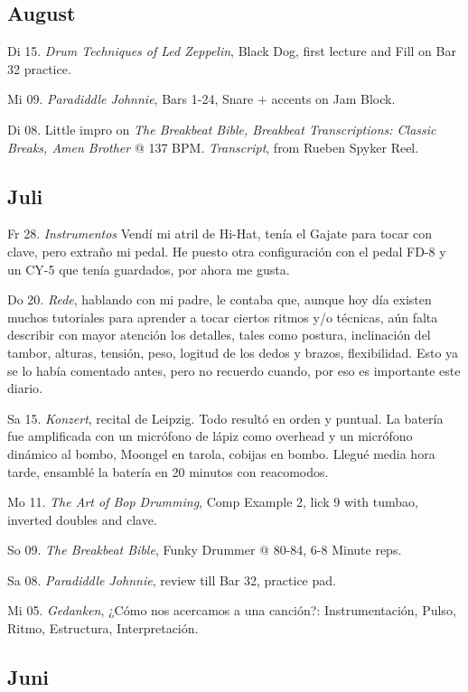 \documentclass[
]{book}
\begin{document}
\subsection*{August}\label{august-2023}

Di 15. \emph{Drum Techniques of Led Zeppelin}, Black Dog, first lecture and Fill on Bar 32 practice.

Mi 09. \emph{Paradiddle Johnnie}, Bars 1-24, Snare + accents on Jam Block.

Di 08. Little impro on \emph{The Breakbeat Bible, Breakbeat Transcriptions: Classic Breaks, Amen Brother} @ 137 BPM. \emph{Transcript}, from Rueben Spyker Reel.

\subsection*{Juli}\label{juli-2023}

Fr 28. \emph{Instrumentos} Vendí mi atril de Hi-Hat, tenía el Gajate para tocar con clave, pero extraño mi pedal. He puesto otra configuración con el pedal FD-8 y un CY-5 que tenía guardados, por ahora me gusta.

Do 20. \emph{Rede}, hablando con mi padre, le contaba que, aunque hoy día existen muchos tutoriales para aprender a tocar ciertos ritmos y/o técnicas, aún falta describir con mayor atención los detalles, tales como postura, inclinación del tambor, alturas, tensión, peso, logitud de los dedos y brazos, flexibilidad. Esto ya se lo había comentado antes, pero no recuerdo cuando, por eso es importante este diario.

Sa 15. \emph{Konzert}, recital de Leipzig. Todo resultó en orden y puntual. La batería fue amplificada con un micrófono de lápiz como overhead y un micrófono dinámico al bombo, Moongel en tarola, cobijas en bombo. Llegué media hora tarde, ensamblé la batería en 20 minutos con reacomodos.

Mo 11. \emph{The Art of Bop Drumming}, Comp Example 2, lick 9 with tumbao, inverted doubles and clave.

So 09. \emph{The Breakbeat Bible}, Funky Drummer @ 80-84, 6-8 Minute reps.

Sa 08. \emph{Paradiddle Johnnie}, review till Bar 32, practice pad.

Mi 05. \emph{Gedanken}, ¿Cómo nos acercamos a una canción?: Instrumentación, Pulso, Ritmo, Estructura, Interpretación.

\subsection*{Juni}\label{juni-2023}
\end{document}
